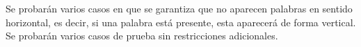 \documentclass{oci}
\begin{document}
\begin{scoreDescription}
   Se probarán varios casos en que se garantiza que no aparecen palabras en sentido
  horizontal, es decir, si una palabra está presente, esta aparecerá de forma vertical.
   Se probarán varios casos de prueba sin restricciones adicionales.
\end{scoreDescription}

\begin{sampleDescription}
\end{sampleDescription}
\end{document}
